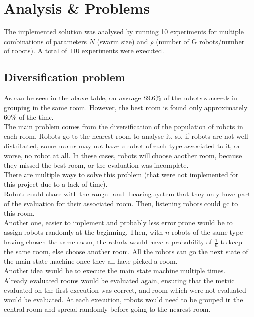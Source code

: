 \section{Analysis \& Problems}

The implemented solution was analysed by running 10 experiments for multiple
combinations of parameters $N$ (swarm size) and $\rho$
(number of G robots/number of robots). A total of 110 experiments were executed.



\subsection{Diversification problem}

As can be seen in the above table, on average 89.6\% of the robots succeeds in grouping in the same room. However, the best room is found only approximately
60\% of the time.\\

The main problem comes from the diversification of the population of robots in
each room. Robots go to the nearest room to analyse it, so, if robots are not
well distributed, some rooms may not have a robot of each type associated to it,
or worse, no robot at all. In these cases, robots will choose another room,
because they missed the best room, or the evaluation was incomplete.\\

There are multiple ways to solve this problem (that were not implemented for
this project due to a lack of time).\\

Robots could share with the range\_and\_bearing system that they only have part of
the evaluation for their associated room. Then, listening robots could go to
this room.\\

Another one, easier to implement and probably less error prone would be to
assign robots randomly at the beginning. Then, with $n$ robots of the same type
having chosen the same room, the robots would have a probability of
$\frac{1}{n}$ to keep the same room, else choose another room. All the robots
can go the next state of the main state machine once they all have picked a
room.\\

Another idea would be to execute the main state machine multiple times. Already
evaluated rooms would be evaluated again, ensuring that the metric evaluated on
the first execution was correct, and room which were not evaluated would be
evaluated. At each execution, robots would need to be grouped in the central
room and spread randomly before going to the nearest room.

